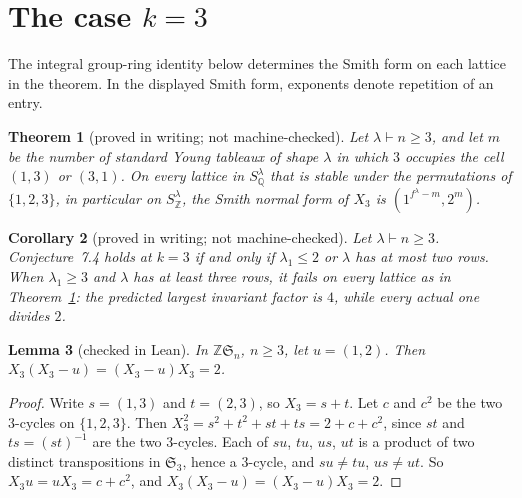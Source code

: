 \documentclass[11pt]{article}
\newtheorem{theorem}{Theorem}
\newtheorem{lemma}[theorem]{Lemma}
\newtheorem{corollary}[theorem]{Corollary}
\theoremstyle{remark}
\newcommand{\Z}{\mathbb{Z}}
\newcommand{\Q}{\mathbb{Q}}
\newcommand{\sn}{\mathfrak{S}_n}
\begin{document}
\section{The case \texorpdfstring{$k=3$}{k = 3}}\label{sec:k3}
The integral group-ring identity below determines the Smith form on each lattice in the theorem. In the displayed Smith form, exponents denote repetition of an entry.
\begin{theorem}[proved in writing; not machine-checked]\label{thm:k3}
Let $\lambda\vdash n\ge3$, and let $m$ be the number of standard Young
tableaux of shape $\lambda$ in which $3$ occupies the cell $(1,3)$ or $(3,1)$.
On every lattice in $S^\lambda_\Q$ that is stable under the permutations of
$\{1,2,3\}$, in particular on $S^\lambda_\Z$, the Smith normal form of $X_3$
is $(1^{f^\lambda-m},2^m)$.
\end{theorem}

\begin{corollary}[proved in writing; not machine-checked]\label{cor:k3}
Let $\lambda\vdash n\ge3$. Conjecture~7.4 holds at $k=3$ if and only if
$\lambda_1\le2$ or $\lambda$ has at most two rows. When $\lambda_1\ge3$ and
$\lambda$ has at least three rows, it fails on every lattice as in
Theorem~\ref{thm:k3}: the predicted largest invariant factor is $4$, while
every actual one divides $2$.
\end{corollary}

\begin{lemma}[checked in Lean]\label{lem:identity}
In $\Z\sn$, $n\ge3$, let $u=(1,2)$. Then $X_3(X_3-u)=(X_3-u)X_3=2$.
\end{lemma}

\begin{proof}
Write $s=(1,3)$ and $t=(2,3)$, so $X_3=s+t$. Let $c$ and $c^2$ be the two
$3$-cycles on $\{1,2,3\}$. Then $X_3^2=s^2+t^2+st+ts=2+c+c^2$, since $st$ and
$ts=(st)^{-1}$ are the two $3$-cycles. Each of $su$, $tu$, $us$, $ut$ is a
product of two distinct transpositions in $\mathfrak{S}_3$, hence a
$3$-cycle, and $su\ne tu$, $us\ne ut$. So $X_3u=uX_3=c+c^2$, and
$X_3(X_3-u)=(X_3-u)X_3=2$.
\end{proof}
\end{document}
